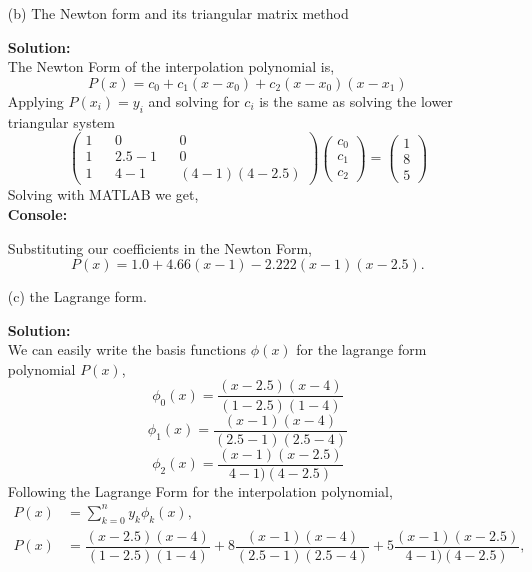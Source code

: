 \documentclass[12pt]{article}
\makeatletter
\theoremstyle{homework}
\newenvironment{exercise}[1]
{\def\@currentlabel{#1}\exercisecore}
{\endexercisecore}
\newcommand{\localhead}[1]{\par\smallskip\noindent\textbf{#1}\nobreak\\}%
\newcommand\solution{\localhead{Solution:}}
\makeatother
\begin{document}
\begin{exercise}{Supplemental 1}
\begin{enumerate}
\item[(b)] The Newton form and its triangular matrix method\\
\solution The Newton Form of the interpolation polynomial is,
\begin{equation*}
  P(x) = c_0 + c_1(x - x_0) + c_2(x - x_0)(x - x_1)
\end{equation*}
Applying $P(x_i) = y_i$ and solving for $c_i$ is the same as solving the lower triangular system 
\begin{equation*}
  \begin{pmatrix}
    1&& 0 && 0 \\
    1 && 2.5 - 1 && 0 \\
    1&& 4 - 1 && (4 - 1)(4 - 2.5) 
  \end{pmatrix}
  \begin{pmatrix}
    c_0 \\
    c_1 \\
    c_2 
  \end{pmatrix}
   = 
   \begin{pmatrix}
    1 \\
    8 \\
    5 
  \end{pmatrix}
\end{equation*}
Solving with MATLAB we get,\\
\textbf{Console:}
\begin{center}

\end{center}
Substituting our coefficients in the Newton Form,
\begin{equation*}
  P(x) = 1.0  + 4.66 (x - 1) - 2.222(x - 1)(x - 2.5).
\end{equation*}
\vspace{.25in}




\item[(c)] the Lagrange form.\\
\solution We can easily write the basis functions $\phi(x)$ for the lagrange form polynomial $P(x)$,
\begin{equation*}
  \phi_0(x) = \dfrac{(x - 2.5)(x - 4)}{(1 - 2.5)(1 - 4)}
\end{equation*}
\begin{equation*}
  \phi_1(x) = \dfrac{(x - 1)(x - 4)}{(2.5 - 1)(2.5 - 4)}
\end{equation*}
\begin{equation*}
  \phi_2(x) = \dfrac{(x - 1)(x - 2.5)}{4 - 1)(4 - 2.5)}
\end{equation*}
Following the Lagrange Form for the interpolation polynomial,
\begin{align*}
  P(x) &= \sum_{k = 0}^n y_k \phi_k(x),\\
  P(x) &= \dfrac{(x - 2.5)(x - 4)}{(1 - 2.5)(1 - 4)} + 8\dfrac{(x - 1)(x - 4)}{(2.5 - 1)(2.5 - 4)} + 5\dfrac{(x - 1)(x - 2.5)}{4 - 1)(4 - 2.5)},
\end{align*}
\end{enumerate}
\end{exercise}
\vspace{.5in}
\end{document}

